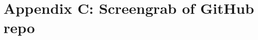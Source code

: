      \chapter{Appendix C: Screengrab of GitHub repo}
     \vspace{-15mm}
     \begin{figure}[!htb]
     \centering
	\label{fig:github}
	\end{figure}